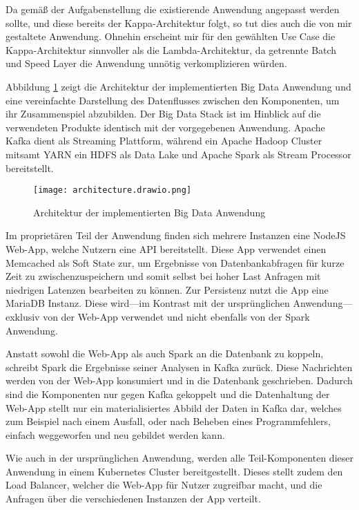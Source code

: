 Da gemäß der Aufgabenstellung die existierende Anwendung angepasst werden sollte, und diese bereits der Kappa-Architektur folgt, so tut dies auch die von mir gestaltete Anwendung.
Ohnehin erscheint mir für den gewählten Use Case die Kappa-Architektur sinnvoller als die Lambda-Architektur, da getrennte Batch und Speed Layer die Anwendung unnötig verkomplizieren würden.

Abbildung \ref{fig:architektur} zeigt die Architektur der implementierten Big Data Anwendung und eine vereinfachte Darstellung des Datenflusses zwischen den Komponenten, um ihr Zusammenspiel abzubilden.
Der Big Data Stack ist im Hinblick auf die verwendeten Produkte identisch mit der vorgegebenen Anwendung.
Apache Kafka dient als Streaming Plattform, während ein Apache Hadoop Cluster mitsamt YARN ein HDFS als Data Lake und Apache Spark als Stream Processor bereitstellt.

\begin{figure}[H]
  \centering
  \texttt{[image: architecture.drawio.png]}
  \caption{Architektur der implementierten Big Data Anwendung}\label{fig:architektur}
\end{figure}

Im proprietären Teil der Anwendung finden sich mehrere Instanzen eine NodeJS Web-App, welche Nutzern eine API bereitstellt.
Diese App verwendet einen Memcached als Soft State zur, um Ergebnisse von Datenbankabfragen für kurze Zeit zu zwischenzuspeichern und somit selbst bei hoher Last Anfragen mit niedrigen Latenzen bearbeiten zu können.
Zur Persistenz nutzt die App eine MariaDB Instanz.
Diese wird---im Kontrast mit der ursprünglichen Anwendung---exklusiv von der Web-App verwendet und nicht ebenfalls von der Spark Anwendung.

Anstatt sowohl die Web-App als auch Spark an die Datenbank zu koppeln, schreibt Spark die Ergebnisse seiner Analysen in Kafka zurück.
Diese Nachrichten werden von der Web-App konsumiert und in die Datenbank geschrieben.
Dadurch sind die Komponenten nur gegen Kafka gekoppelt und die Datenhaltung der Web-App stellt nur ein materialisiertes Abbild der Daten in Kafka dar, welches zum Beispiel nach einem Ausfall, oder nach Beheben eines Programmfehlers, einfach weggeworfen und neu gebildet werden kann.

Wie auch in der ursprünglichen Anwendung, werden alle Teil-Komponenten dieser Anwendung in einem Kubernetes Cluster bereitgestellt.
Dieses stellt zudem den Load Balancer, welcher die Web-App für Nutzer zugreifbar macht, und die Anfragen über die verschiedenen Instanzen der App verteilt.

